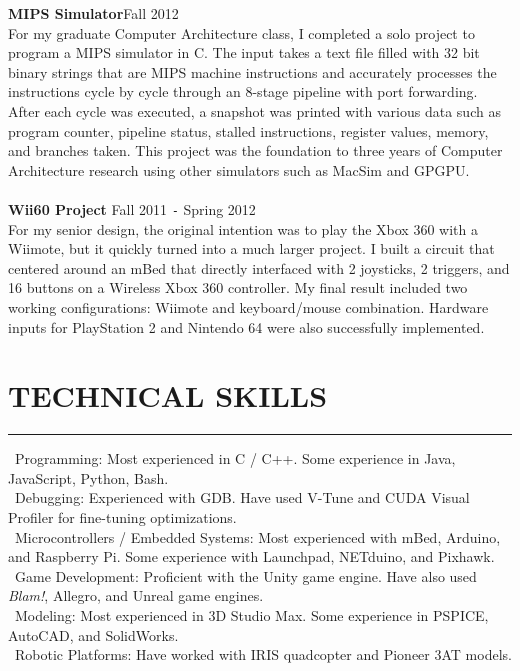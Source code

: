 \documentclass{res}
\begin{document}
\begin{resume}
	{\bf MIPS Simulator}\hfill Fall 2012\\
	For my graduate Computer Architecture class, I completed a solo project to program a MIPS simulator in C. The input takes a text file filled with 32 bit binary strings that are MIPS machine instructions and accurately processes the instructions cycle by cycle through an 8-stage pipeline with port forwarding. After each cycle was executed, a snapshot was printed with various data such as program counter, pipeline status, stalled instructions, register values, memory, and branches taken. This project was the foundation to three years of Computer Architecture research using other simulators such as MacSim and GPGPU.\\\\
	{\bf Wii60 Project} \hfill Fall 2011 \texttt{-} Spring 2012 \\
	For my senior design, the original intention was to play the Xbox 360 with a Wiimote, but it quickly turned into a much larger project. I built a circuit that centered around an mBed that directly interfaced with 2 joysticks, 2 triggers, and 16 buttons on a Wireless Xbox 360 controller. My final result included two working configurations: Wiimote and keyboard/mouse combination. Hardware inputs for PlayStation 2 and Nintendo 64 were also successfully implemented.
	
\section{TECHNICAL SKILLS}
	\vspace{0.005in}	
	\rule{\textwidth}{0.5pt}	
		\textbullet \ Programming: Most experienced in C / C++. Some experience in Java, JavaScript, Python, Bash.\\
		\textbullet \ Debugging: Experienced with GDB. Have used V-Tune and CUDA Visual Profiler for fine-tuning optimizations.\\
		\textbullet \ Microcontrollers / Embedded Systems: Most experienced with mBed, Arduino, and Raspberry Pi. Some experience with Launchpad, NETduino, and Pixhawk.\\
		\textbullet \ Game Development: Proficient with the Unity game engine. Have also used \textit{Blam!}, Allegro, and Unreal game engines.\\
		\textbullet \ Modeling: Most experienced in 3D Studio Max. Some experience in PSPICE, AutoCAD, and SolidWorks.\\
		\textbullet \ Robotic Platforms: Have worked with IRIS quadcopter and Pioneer 3AT models.
		\clearpage


\end{resume}
\end{document}
